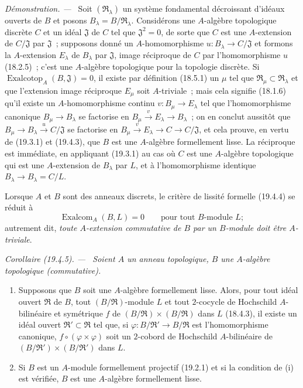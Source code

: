 \documentclass[10pt,oneside]{book}
\makeatletter
\newcommand{\setmanualcurrentlabel}[1]{\def\@currentlabel{#1}}
\newenvironment{corollary}[1][]{%
  \setmanualcurrentlabel{#1}\par\medskip\noindent\itshape Corollaire (#1). ---\ }{\par}
\newenvironment{proof}{%
  \par\medskip\noindent\textit{Démonstration. ---\ }}{\par}
\makeatother
\begin{document}
\begin{proof}
Soit $(\mathfrak R_\lambda)$ un système fondamental décroissant d'idéaux
ouverts de $B$ et posons $B_\lambda=B/\mathfrak R_\lambda$.
Considérons une $A$-algèbre topologique discrète $C$ et un idéal
$\mathfrak J$ de $C$ tel que $\mathfrak J^2=0$, de sorte que $C$ est une
$A$-extension de $C/\mathfrak J$ par $\mathfrak J$~; supposons donné un
$A$-homomorphisme $u:B_\lambda\to C/\mathfrak J$ et formons la
$A$-extension $E_\lambda$ de $B_\lambda$ par $\mathfrak J$, image
réciproque de $C$ par l'homomorphisme $u$ (18.2.5)~; c'est une $A$-algèbre
topologique pour la topologie discrète. Si
$\operatorname{Exalcotop}_A(B,\mathfrak J)=0$, il existe par définition (18.5.1) un
$\mu$ tel que $\mathfrak R_\mu\subset\mathfrak R_\lambda$ et que
l'extension image réciproque $E_\mu$ soit $A$-triviale~; mais cela signifie
(18.1.6) qu'il existe un $A$-homomorphisme continu
$v:B_\mu\to E_\lambda$ tel que l'homomorphisme canonique
$B_\mu\to B_\lambda$ se factorise en
$B_\mu\xrightarrow{v}E_\lambda\to B_\lambda$~; on en conclut
aussitôt que $B_\mu\to B_\lambda\xrightarrow{u}C/\mathfrak J$ se
factorise en
$B_\mu\xrightarrow{v}E_\lambda\to C\to C/\mathfrak J$, et cela
prouve, en vertu de (19.3.1) et (19.4.3), que $B$ est une $A$-algèbre
formellement lisse. La réciproque est immédiate, en appliquant (19.3.1) au cas
où $C$ est une $A$-algèbre topologique qui est une $A$-extension de
$B_\lambda$ par $L$, et à l'homomorphisme identique
$B_\lambda\to B_\lambda=C/L$.
\end{proof}

Lorsque $A$ et $B$ sont des anneaux discrets, le critère de lissité formelle
(19.4.4) se réduit à
\begin{equation}
\tag{19.4.4.1}
\label{0.19.4.4.1-fr}
\operatorname{Exalcom}_A(B,L)=0\qquad\text{pour tout $B$-module $L$};
\end{equation}
autrement dit, \emph{toute $A$-extension commutative de $B$ par un
$B$-module doit être $A$-triviale}.

\begin{corollary}[19.4.5]
\label{0.19.4.5-fr}
Soient $A$ un anneau topologique, $B$ une $A$-algèbre topologique
(commutative).
\begin{enumerate}
  \item[(i)] Supposons que $B$ soit une $A$-algèbre formellement lisse.
  Alors, pour tout idéal ouvert $\mathfrak R$ de $B$, tout
  $(B/\mathfrak R)$-module $L$ et tout $2$-cocycle de Hochschild
  $A$-bilinéaire et symétrique $f$ de
  $(B/\mathfrak R)\times(B/\mathfrak R)$ dans $L$ (18.4.3), il existe un
  idéal ouvert $\mathfrak R'\subset\mathfrak R$ tel que, si
  $\varphi:B/\mathfrak R'\to B/\mathfrak R$ est l'homomorphisme
  canonique, $f\circ(\varphi\times\varphi)$ soit un $2$-cobord de
  Hochschild $A$-bilinéaire de
  $(B/\mathfrak R')\times(B/\mathfrak R')$ dans $L$.
  \item[(ii)] Si $B$ est un $A$-module formellement projectif (19.2.1) et si
  la condition de (i) est vérifiée, $B$ est une $A$-algèbre formellement
  lisse.
\end{enumerate}
\end{corollary}
\end{document}
